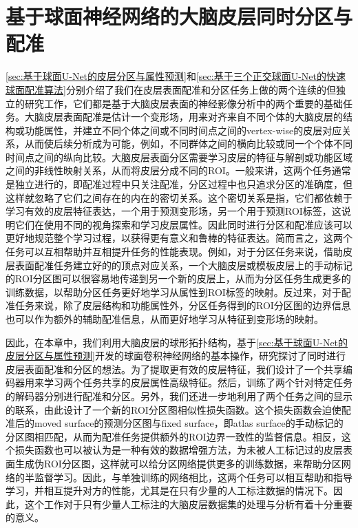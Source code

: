 \chapter{基于球面神经网络的大脑皮层同时分区与配准}\label{sec:基于球面神经网络的大脑皮层同时分区与配准}

\ref{sec:基于球面U-Net的皮层分区与属性预测}和\ref{sec:基于三个正交球面U-Net的快速球面配准算法}分别介绍了我们在皮层表面配准和分区任务上做的两个连续的但独立的研究工作，它们都是基于大脑皮层表面的神经影像分析中的两个重要的基础任务。大脑皮层表面配准是估计一个变形场，用来对齐来自不同个体的大脑皮层的结构或功能属性，并建立不同个体之间或不同时间点之间的vertex-wise的皮层对应关系\cite{fischl1999high,yeo2009spherical,zhao2020unsupervised}，从而使后续分析成为可能，例如，不同群体之间的横向比较或同一个个体不同时间点之间的纵向比较。大脑皮层表面分区需要学习皮层的特征与解剖或功能区域之间的非线性映射关系，从而将皮层分成不同的ROI\cite{desikan2006automated,zhao2021sphericalDeformable,wu2018registration}。一般来讲，这两个任务通常是独立进行的\cite{li2019computational}，即配准过程中只关注配准，分区过程中也只追求分区的准确度，但这样就忽略了它们之间存在的内在的密切关系。这个密切关系是指，它们都依赖于学习有效的皮层特征表达，一个用于预测变形场，另一个用于预测ROI标签，这说明它们在使用不同的视角探索和学习皮层属性。因此同时进行分区和配准应该可以更好地规范整个学习过程，以获得更有意义和鲁棒的特征表达。简而言之，这两个任务可以互相帮助并互相提升任务的性能表现。例如，对于分区任务来说，借助皮层表面配准任务建立好的的顶点对应关系，一个大脑皮层或模板皮层上的手动标记的ROI分区图可以很容易地传递到另一个新的皮层上，从而为分区任务生成更多的训练数据，以帮助分区任务更好地学习从属性到ROI标签的映射。反过来，对于配准任务来说，除了皮层结构和功能属性外，分区任务得到的ROI分区图的边界信息也可以作为额外的辅助配准信息，从而更好地学习从特征到变形场的映射。

因此，在本章中，我们利用大脑皮层的球形拓扑结构，基于\ref{sec:基于球面U-Net的皮层分区与属性预测}开发的球面卷积神经网络的基本操作，研究探讨了同时进行皮层表面配准和分区的想法。为了提取更有效的皮层特征，我们设计了一个共享编码器用来学习两个任务共享的皮层属性高级特征。然后，训练了两个针对特定任务的解码器分别进行配准和分区。另外，我们还进一步地利用了两个任务之间的显示的联系，由此设计了一个新的ROI分区图相似性损失函数。这个损失函数会迫使配准后的moved surface的预测分区图与fixed surface，即atlas surface的手动标记的分区图相匹配，从而为配准任务提供额外的ROI边界一致性的监督信息。相反，这个损失函数也可以被认为是一种有效的数据增强方法，为未被人工标记过的皮层表面生成伪ROI分区图，这样就可以给分区网络提供更多的训练数据，来帮助分区网络的半监督学习\cite{xu2019deepatlas}。因此，与单独训练的网络相比，这两个任务可以相互帮助和指导学习，并相互提升对方的性能，尤其是在只有少量的人工标注数据的情况下。因此，这个工作对于只有少量人工标注的大脑皮层数据集的处理与分析有着十分重要的意义。

